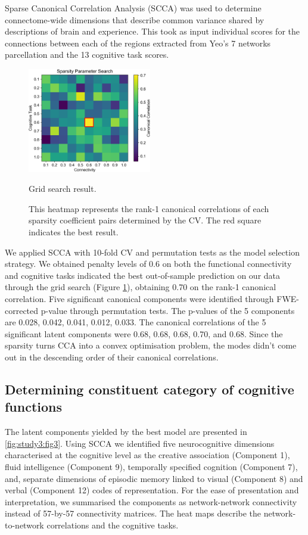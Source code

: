 Sparse Canonical Correlation Analysis (SCCA) was used to determine connectome-wide dimensions that describe common variance shared by descriptions of brain and experience. This took as input individual scores for the connections between each of the regions extracted from Yeo's 7 networks parcellation and the 13 cognitive task scores.

\begin{figure}
    \centering
    \includegraphics[width=0.48\textwidth]{study3/image/study3fig2.png}
    \caption{Grid search result.}
    \caption*{This heatmap represents the rank-1 canonical correlations of each sparsity coefficient pairs determined by the CV. The red square indicates the best result.}
    \label{fig:study3:fig2}
\end{figure}

We applied SCCA with 10-fold CV and permutation tests as the model selection strategy. We obtained penalty levels of 0.6 on both the functional connectivity and cognitive tasks indicated the best out-of-sample prediction on our data through the grid search (Figure \ref{fig:study3:fig2}), obtaining 0.70 on the rank-1 canonical correlation. Five significant canonical components were identified through FWE-corrected p-value through permutation tests. The p-values of the 5 components are 0.028, 0.042, 0.041, 0.012, 0.033. The canonical correlations of the 5 significant latent components were 0.68, 0.68, 0.68, 0.70, and 0.68. Since the sparsity turns CCA into a convex optimisation problem, the modes didn't come out in the descending order of their canonical correlations.

\subsection{Determining constituent category of cognitive functions}
\label{study3:results:category}

The latent components yielded by the best model are presented in \cref{fig:study3:fig3}. Using SCCA we identified five neurocognitive dimensions characterised at the cognitive level as the creative association (Component 1), fluid intelligence (Component 9), temporally specified cognition (Component 7), and, separate dimensions of episodic memory linked to visual (Component 8) and verbal (Component 12) codes of representation. For the ease of presentation and interpretation, we summarised the components as network-network connectivity instead of 57-by-57 connectivity matrices. The heat maps describe the network-to-network correlations and the cognitive tasks.

